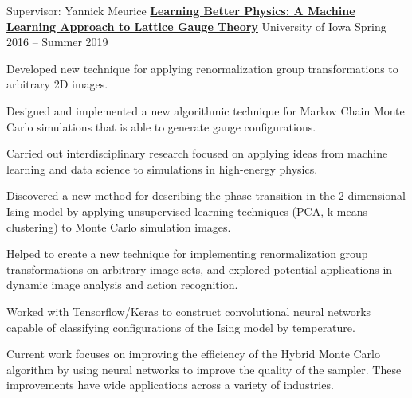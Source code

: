 \vspace{-1.75ex}


\begin{cventries}
  \cventry%
  {Supervisor: Yannick Meurice} %
  {\href{https://ir.uiowa.edu/etd/6944/}{\textbf{Learning Better
  Physics: A Machine Learning Approach to Lattice Gauge Theory}}}
  {University of Iowa} %
  {Spring 2016 -- Summer 2019} %
  {
    \begin{cvitemscustom} %
    \item{Developed new technique for applying renormalization group
      transformations to arbitrary 2D images.}
    \item{Designed and implemented a new algorithmic technique for Markov Chain
      Monte Carlo simulations that is able to generate gauge configurations.}
    \item {Carried out interdisciplinary research focused on applying ideas
        from machine learning and data science to simulations in high-energy
      physics.}
    \item{Discovered a new method for describing the phase transition in the
        2-dimensional Ising model by applying unsupervised learning techniques
      (PCA, k-means clustering) to Monte Carlo simulation images.}
    \item {Helped to create a new technique for implementing
        renormalization group transformations on arbitrary image
        sets, and explored potential applications in dynamic image
      analysis and action recognition.}
    \item {Worked with Tensorflow/Keras to construct convolutional
        neural networks capable of classifying configurations of the
      Ising model by temperature.}
    \item {Current work focuses on improving the efficiency of the Hybrid
        Monte Carlo algorithm by using neural networks to improve the
        quality of the sampler. These improvements have wide applications
      across a variety of industries.}
    \end{cvitemscustom}
  }
\end{cventries}
